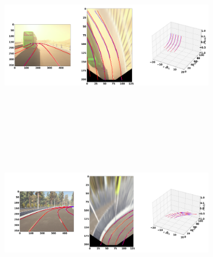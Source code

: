 \begin{figure}[h]
      \caption{Qualitative results of the  GenLaneNet\cite{guo2020gen} trained with complex binary lane segmentation architecture on visually varied scenes from sim3D\cite{guo2020gen} dataset: (a) uphill (b) downhill scenario. The ground-truth lines are color-coded in red and the predicted lanes in blue.}
        \centering
        \begin{subfigure}{1\textwidth}
        \includegraphics[width=1\linewidth, height=7cm]{images/uphill_illus.png} 
        \caption{\cite{guo2020gen}}
        \label{fig:subim1}
        \end{subfigure}
        \begin{subfigure}{1\textwidth}
        \includegraphics[width=1\linewidth,height=7cm]{images/downhill_illus.png}
        \caption{\cite{guo2020gen}}
        \label{fig:subim2}
        \end{subfigure}
        \end{figure}
        
        
